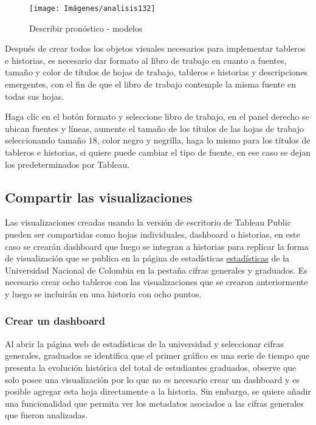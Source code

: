 \documentclass[
]{book}
\begin{document}
\begin{figure}

{\centering \texttt{[image: Imágenes/analisis132]} 

}

\caption{Describir pronóstico - modelos}\label{fig:modelospronosticos-fig}
\end{figure}

Después de crear todos los objetos visuales necesarios para implementar tableros e historias, es necesario dar formato al libro de trabajo en cuanto a fuentes, tamaño y color de títulos de hojas de trabajo, tableros e historias y descripciones emergentes, con el fin de que el libro de trabajo contemple la misma fuente en todas sus hojas.

Haga clic en el botón formato y seleccione libro de trabajo, en el panel derecho se ubican fuentes y líneas, aumente el tamaño de los títulos de las hojas de trabajo seleccionando tamaño \(18\), color negro y negrilla, haga lo mismo para los títulos de tableros e historias, si quiere puede cambiar el tipo de fuente, en ese caso se dejan los predeterminados por Tableau.

\hypertarget{compartir-las-visualizaciones}{%
\subsection{Compartir las visualizaciones}\label{compartir-las-visualizaciones}}

Las visualizaciones creadas usando la versión de escritorio de Tableau Public pueden ser compartidas como hojas individuales, dashboard o historias, en este caso se crearán dashboard que luego se integran a historias para replicar la forma de visualización que se publica en la página de estadísticas \href{http://estadisticas.unal.edu.co/home/}{estadísticas} de la Universidad Nacional de Colombia en la pestaña cifras generales y graduados. Es necesario crear ocho tableros con las visualizaciones que se crearon anteriormente y luego se incluirán en una historia con ocho puntos.

\hypertarget{crear-un-dashboard}{%
\subsubsection{Crear un dashboard}\label{crear-un-dashboard}}

Al abrir la página web de estadísticas de la universidad y seleccionar cifras generales, graduados se identifica que el primer gráfico es una serie de tiempo que presenta la evolución histórica del total de estudiantes graduados, observe que solo posee una visualización por lo que no es necesario crear un dashboard y es posible agregar esta hoja directamente a la historia. Sin embargo, se quiere añadir una funcionalidad que permita ver los metadatos asociados a las cifras generales que fueron analizadas.
\end{document}
